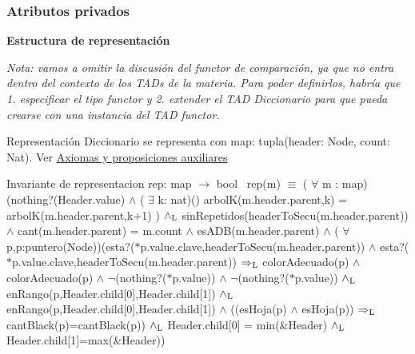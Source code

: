\subsubsection*{Atributos privados}
\begin{Indent}{\bf Estructura de representación}\par
{\em Nota\+: vamos a omitir la discusión del functor de comparación, ya que no entra dentro del contexto de los T\+A\+Ds de la materia. Para poder definirlos, habría que 1. especificar el tipo functor y 2. extender el T\+AD Diccionario para que pueda crearse con una instancia del T\+AD functor.

\begin{DoxyParagraph}{Representación}
Diccionario se representa con map\+: tupla(header\+: Node, count\+: Nat). Ver \hyperlink{axiomas}{Axiomas y proposiciones auxiliares}
\end{DoxyParagraph}
\begin{DoxyParagraph}{Invariante de representacion}
rep\+: map $\to$ bool~\newline
rep(m) $\equiv$ ( $\forall$ m \+: map)(nothing?(Header.\+value) $\land$ ( $\exists$ k\+: nat)() arbolK(m.\+header.\+parent,k) = arbolK(m.\+header.\+parent,k+1) ) $\land_{\rm L}$ sin\+Repetidos(header\+To\+Secu(m.\+header.\+parent)) $\land$ cant(m.\+header.\+parent) = m.\+count $\land$ es\+A\+DB(m.\+header.\+parent) $\land$ ( $\forall$ p,p\textquotesingle{}\+:puntero(\+Node))(esta?($\ast$p.value.\+clave,header\+To\+Secu(m.\+header.\+parent)) $\land$ esta?($\ast$p\textquotesingle{}.value.\+clave,header\+To\+Secu(m.\+header.\+parent)) $\Rightarrow_{\rm L}$ color\+Adecuado(p) $\land$ color\+Adecuado(p\textquotesingle{}) $\land$ $\lnot$(nothing?($\ast$p.value)) $\land$ $\lnot$(nothing?($\ast$p\textquotesingle{}.value)) $\land_{\rm L}$ en\+Rango(p,Header.\+child\mbox{[}0\mbox{]},Header.\+child\mbox{[}1\mbox{]}) $\land_{\rm L}$ en\+Rango(p\textquotesingle{},Header.\+child\mbox{[}0\mbox{]},Header.\+child\mbox{[}1\mbox{]}) $\land$ ((es\+Hoja(p) $\land$ es\+Hoja(p\textquotesingle{})) $\Rightarrow_{\rm L}$ cant\+Black(p)=cant\+Black(p\textquotesingle{})) $\land_{\rm L}$ Header.\+child\mbox{[}0\mbox{]} = min(\&\+Header) $\land_{\rm L}$ Header.\+child\mbox{[}1\mbox{]}=max(\&\+Header)) 
\end{DoxyParagraph}


}
\end{Indent}
